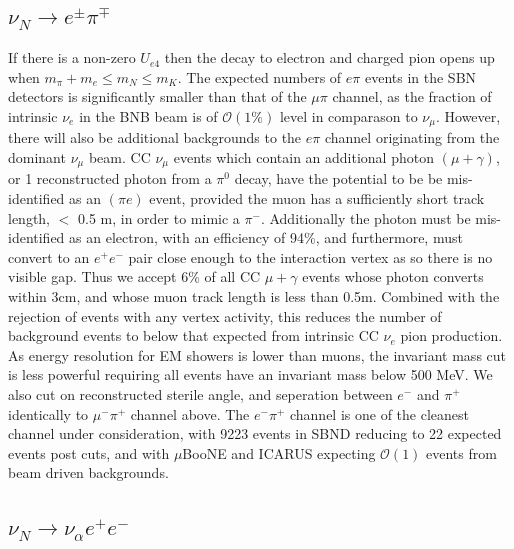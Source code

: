 \documentclass[11pt, a4paper]{article}
\begin{document}
\subsection{$\nu_N \rightarrow e^\pm \pi^\mp$ }
If there is a non-zero $U_{e4}$ then the decay to electron and charged pion opens up when $m_\pi +m_e \leq m_N \leq m_K$. The expected numbers of $e \pi$ events in the SBN detectors is significantly smaller than that of the $\mu \pi$ channel, as the fraction of intrinsic $\nu_e$ in the BNB beam is of
$\mathcal{O}(1\%)$ level in comparason to $\nu_\mu$. However, there will also be additional backgrounds to the
$e \pi$ channel originating from the dominant $\nu_\mu$ beam. CC $\nu_\mu$ events which contain an additional photon $(\mu+\gamma)$, or 1 reconstructed photon from a $\pi^0$ decay, have the potential to be be mis-identified as an $(\pi
e)$ event, provided the muon has a sufficiently short track length, $<$ 0.5 m, in order to mimic a $\pi^-$. Additionally the photon must be mis-identified as an electron, with an efficiency of 94\%, and furthermore, must convert to an $e^+e^-$ pair close enough to the interaction vertex as so there is no visible gap. Thus we accept 6\% of all CC $\mu+\gamma$ events whose photon converts within 3cm, and whose muon track length is less than 0.5m. Combined with the rejection of events with any vertex activity, this reduces the number of background events to below that expected from intrinsic CC $\nu_e$ pion production. As energy resolution for EM showers is lower than muons, the invariant mass cut is less powerful requiring all events have an invariant mass below 500 MeV. We also cut on reconstructed sterile angle, and seperation between  $e^-$ and $\pi^+$ identically to $\mu^- \pi^+$ channel above. The $e^- \pi^+$ channel is one of the cleanest channel under consideration, with 9223 events in SBND reducing to 22 expected events post cuts, and with $\mu$BooNE and ICARUS expecting $\mathcal{O}(1)$ events from beam driven backgrounds.


\subsection{$\nu_N \rightarrow \nu_\alpha e^+ e^-$ }
\end{document}

